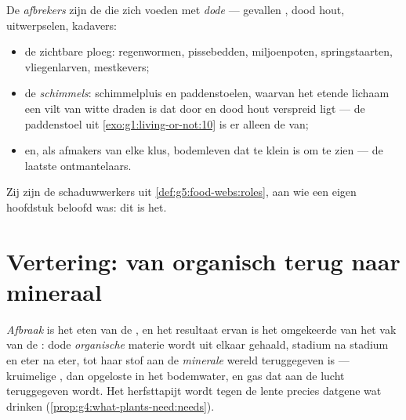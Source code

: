 \begin{definition}[Afbrekers]\label{def:g6:decomposers-and-soil:decomposers}
De \emph{afbrekers} zijn de  die zich
voeden met \emph{dode } --- gevallen , dood
hout, uitwerpselen, kadavers:
\begin{itemize}
  \item de zichtbare ploeg: regenwormen, pissebedden, miljoenpoten,
        springstaarten, vliegenlarven, mestkevers;
  \item de \emph{schimmels}: schimmelpluis en
        paddenstoelen, waarvan het etende lichaam een vilt van witte
        draden is dat door  en dood hout verspreid ligt --- de
        paddenstoel uit \cref{exo:g1:living-or-not:10} is er alleen de
         van;
  \item en, als afmakers van elke klus, bodemleven dat te klein is om te
        zien --- de laatste ontmantelaars.
\end{itemize}
Zij zijn de schaduwwerkers uit \cref{def:g5:food-webs:roles}, aan wie een
eigen hoofdstuk beloofd was: dit is het.
\end{definition}

\section{Vertering: van organisch terug naar mineraal}

\begin{proposition}\label{prop:g6:decomposers-and-soil:decomposition}
\emph{Afbraak} is het eten van de , en het
resultaat ervan is het omgekeerde van het vak van de : dode
\emph{organische} materie wordt uit elkaar gehaald, stadium na stadium en
eter na eter, tot haar stof aan de \emph{minerale} wereld teruggegeven is
--- kruimelige , dan opgeloste  in het bodemwater, en
gas dat aan de lucht teruggegeven wordt. Het herfsttapijt wordt tegen de
lente precies datgene wat  drinken
(\cref{prop:g4:what-plants-need:needs}).
\end{proposition}
\admitted

